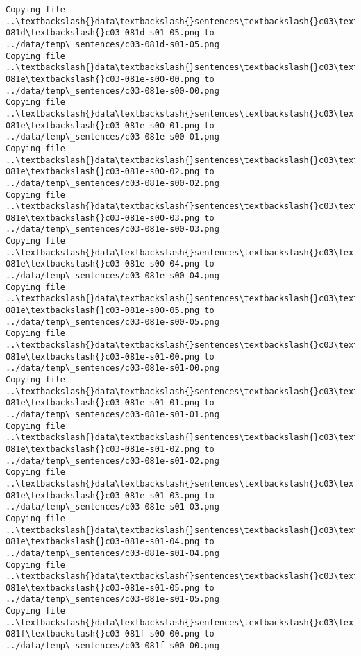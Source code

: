 \documentclass[11pt]{article}
\begin{document}
\begin{Verbatim}[commandchars=\\\{\}]
Copying file ..\textbackslash{}data\textbackslash{}sentences\textbackslash{}c03\textbackslash{}c03-081d\textbackslash{}c03-081d-s01-05.png to
../data/temp\_sentences/c03-081d-s01-05.png
Copying file ..\textbackslash{}data\textbackslash{}sentences\textbackslash{}c03\textbackslash{}c03-081e\textbackslash{}c03-081e-s00-00.png to
../data/temp\_sentences/c03-081e-s00-00.png
Copying file ..\textbackslash{}data\textbackslash{}sentences\textbackslash{}c03\textbackslash{}c03-081e\textbackslash{}c03-081e-s00-01.png to
../data/temp\_sentences/c03-081e-s00-01.png
Copying file ..\textbackslash{}data\textbackslash{}sentences\textbackslash{}c03\textbackslash{}c03-081e\textbackslash{}c03-081e-s00-02.png to
../data/temp\_sentences/c03-081e-s00-02.png
Copying file ..\textbackslash{}data\textbackslash{}sentences\textbackslash{}c03\textbackslash{}c03-081e\textbackslash{}c03-081e-s00-03.png to
../data/temp\_sentences/c03-081e-s00-03.png
Copying file ..\textbackslash{}data\textbackslash{}sentences\textbackslash{}c03\textbackslash{}c03-081e\textbackslash{}c03-081e-s00-04.png to
../data/temp\_sentences/c03-081e-s00-04.png
Copying file ..\textbackslash{}data\textbackslash{}sentences\textbackslash{}c03\textbackslash{}c03-081e\textbackslash{}c03-081e-s00-05.png to
../data/temp\_sentences/c03-081e-s00-05.png
Copying file ..\textbackslash{}data\textbackslash{}sentences\textbackslash{}c03\textbackslash{}c03-081e\textbackslash{}c03-081e-s01-00.png to
../data/temp\_sentences/c03-081e-s01-00.png
Copying file ..\textbackslash{}data\textbackslash{}sentences\textbackslash{}c03\textbackslash{}c03-081e\textbackslash{}c03-081e-s01-01.png to
../data/temp\_sentences/c03-081e-s01-01.png
Copying file ..\textbackslash{}data\textbackslash{}sentences\textbackslash{}c03\textbackslash{}c03-081e\textbackslash{}c03-081e-s01-02.png to
../data/temp\_sentences/c03-081e-s01-02.png
Copying file ..\textbackslash{}data\textbackslash{}sentences\textbackslash{}c03\textbackslash{}c03-081e\textbackslash{}c03-081e-s01-03.png to
../data/temp\_sentences/c03-081e-s01-03.png
Copying file ..\textbackslash{}data\textbackslash{}sentences\textbackslash{}c03\textbackslash{}c03-081e\textbackslash{}c03-081e-s01-04.png to
../data/temp\_sentences/c03-081e-s01-04.png
Copying file ..\textbackslash{}data\textbackslash{}sentences\textbackslash{}c03\textbackslash{}c03-081e\textbackslash{}c03-081e-s01-05.png to
../data/temp\_sentences/c03-081e-s01-05.png
Copying file ..\textbackslash{}data\textbackslash{}sentences\textbackslash{}c03\textbackslash{}c03-081f\textbackslash{}c03-081f-s00-00.png to
../data/temp\_sentences/c03-081f-s00-00.png

\end{Verbatim}
\end{document}
